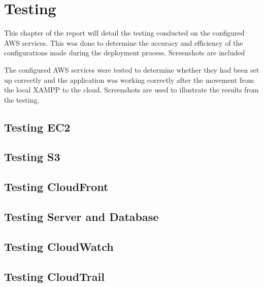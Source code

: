 \chapter{Testing}\label{ch:testing}

This chapter of the report will detail the testing conducted on the configured AWS services.
This was done to determine the accuracy and efficiency of the configurations made during the deployment process.
Screenshots are included

The configured AWS services were tested to determine whether they had been set up correctly
and the application was working correctly after the movement from the local XAMPP to the
cloud. Screenshots are used to illustrate the results from the testing.

\section{Testing EC2}\label{sec:testing_ec2}

\section{Testing S3}\label{sec:testing_s3}

\section{Testing CloudFront}\label{sec:testing_cloudfront}

\section{Testing Server and Database}\label{sec:testing_server_database}

\section{Testing CloudWatch}\label{sec:testing_cloudwatch}

\section{Testing CloudTrail}\label{sec:testing_cloudtrail}
